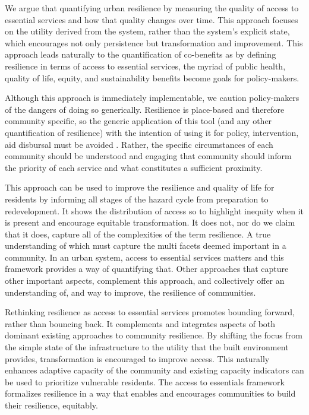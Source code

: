 \documentclass[9pt,twocolumn,twoside,lineno]{pnas-new}
\begin{document}
We argue that quantifying urban resilience by measuring the quality of access to essential services and how that quality changes over time. This approach focuses on the utility derived from the system, rather than the system’s explicit state, which encourages not only persistence but transformation and improvement. This approach leads naturally to the quantification of co-benefits as by defining resilience in terms of access to essential services, the myriad of public health, quality of life, equity, and sustainability benefits become goals for policy-makers. 

Although this approach is immediately implementable, we caution policy-makers of the dangers of doing so generically. Resilience is place-based and therefore community specific, so the generic application of this tool (and any other quantification of resilience) with the intention of using it for policy, intervention, aid disbursal must be avoided \cite{Levine2014-je}. Rather, the specific circumstances of each community should be understood and engaging that community should inform the priority of each service and what constitutes a sufficient proximity. 

This approach can be used to improve the resilience and quality of life for residents by informing all stages of the hazard cycle from preparation to redevelopment. It shows the distribution of access so to highlight inequity when it is present and encourage equitable transformation. It does not, nor do we claim that it does, capture all of the complexities of the term resilience. A true understanding of which must capture the multi facets deemed important in a community. In an urban system, access to essential services matters and this framework provides a way of quantifying that. Other approaches that capture other important aspects, complement this approach, and collectively offer an understanding of, and way to improve, the resilience of communities.

Rethinking resilience as access to essential services promotes bounding forward, rather than bouncing back. It complements and integrates aspects of both dominant existing approaches to community resilience. By shifting the focus from the simple state of the infrastructure to the utility that the built environment provides, transformation is encouraged to improve access. This naturally enhances adaptive capacity of the community and existing capacity indicators can be used to prioritize vulnerable residents. The access to essentials framework formalizes resilience in a way that enables and encourages communities to build their resilience, equitably. 
\end{document}
